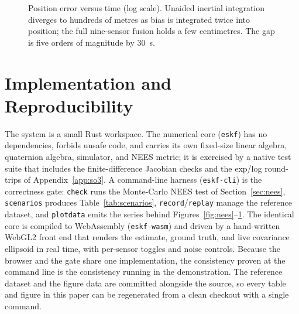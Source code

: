 \documentclass[11pt]{article}
\begin{document}
\begin{figure}[t]
  \centering
  \caption{Position error versus time (log scale). Unaided inertial integration diverges to hundreds of
  metres as bias is integrated twice into position; the full nine-sensor fusion holds a few centimetres.
  The gap is five orders of magnitude by \SI{30}{\second}.}
  \label{fig:drift}
\end{figure}

\section{Implementation and Reproducibility}
\label{sec:impl}

The system is a small Rust workspace. The numerical core (\texttt{eskf}) has no dependencies, forbids
unsafe code, and carries its own fixed-size linear algebra, quaternion algebra, simulator, and NEES
metric; it is exercised by a native test suite that includes the finite-difference Jacobian checks and
the exp/log round-trips of Appendix~\ref{app:so3}. A command-line harness (\texttt{eskf-cli}) is the
correctness gate: \texttt{check} runs the Monte-Carlo NEES test of Section~\ref{sec:nees},
\texttt{scenarios} produces Table~\ref{tab:scenarios}, \texttt{record}/\texttt{replay} manage the
reference dataset, and \texttt{plotdata} emits the series behind Figures~\ref{fig:nees}--\ref{fig:drift}.
The identical core is compiled to WebAssembly (\texttt{eskf-wasm}) and driven by a hand-written WebGL2
front end that renders the estimate, ground truth, and live covariance ellipsoid in real time, with
per-sensor toggles and noise controls. Because the browser and the gate share one implementation, the
consistency proven at the command line is the consistency running in the demonstration. The reference
dataset and the figure data are committed alongside the source, so every table and figure in this paper
can be regenerated from a clean checkout with a single command.
\end{document}
